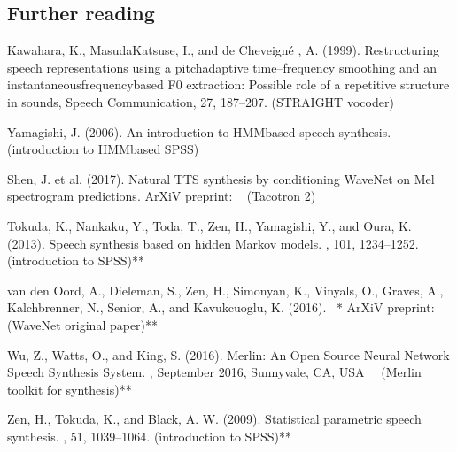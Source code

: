 \documentclass[letterpaper,10pt,english]{jupyterBook}
\begin{document}
\subsection{Further reading}
\label{\detokenize{Synthesis/Statistical_parametric_speech_synthesis:further-reading}}
\sphinxAtStartPar
Kawahara, K., Masuda\sphinxhyphen{}Katsuse, I., and de Cheveigné , A. (1999).
Restructuring speech representations using a pitch\sphinxhyphen{}adaptive
time–frequency smoothing and an instantaneous\sphinxhyphen{}frequency\sphinxhyphen{}based F0
extraction: Possible role of a repetitive structure in sounds, Speech
Communication, 27, 187–207. (STRAIGHT vocoder)

\sphinxAtStartPar
Yamagishi, J. (2006). An introduction to HMM\sphinxhyphen{}based speech synthesis. 
(introduction to HMM\sphinxhyphen{}based SPSS)

\sphinxAtStartPar
Shen, J. et al. (2017). Natural TTS synthesis by conditioning WaveNet on
Mel spectrogram predictions. ArXiV pre\sphinxhyphen{}print:
   (Tacotron 2)

\sphinxAtStartPar
Tokuda, K., Nankaku, Y., Toda, T., Zen, H., Yamagishi, Y., and Oura, K.
(2013). Speech synthesis based on hidden Markov models. , 101, 1234–1252. (introduction to SPSS)**

\sphinxAtStartPar
van den Oord, A., Dieleman, S., Zen, H., Simonyan, K., Vinyals, O.,
Graves, A., Kalchbrenner, N., Senior, A., and Kavukcuoglu, K. (2016).
 * ArXiV pre\sphinxhyphen{}print:
  (WaveNet original paper)**

\sphinxAtStartPar
Wu, Z., Watts, O., and King, S. (2016). Merlin: An Open Source Neural
Network Speech Synthesis System. , September 2016, Sunnyvale, CA,
USA   (Merlin toolkit for
synthesis)**

\sphinxAtStartPar
Zen, H., Tokuda, K., and Black, A. W. (2009). Statistical parametric
speech synthesis. , 51, 1039–1064.
(introduction to SPSS)**

\sphinxstepscope
\end{document}
